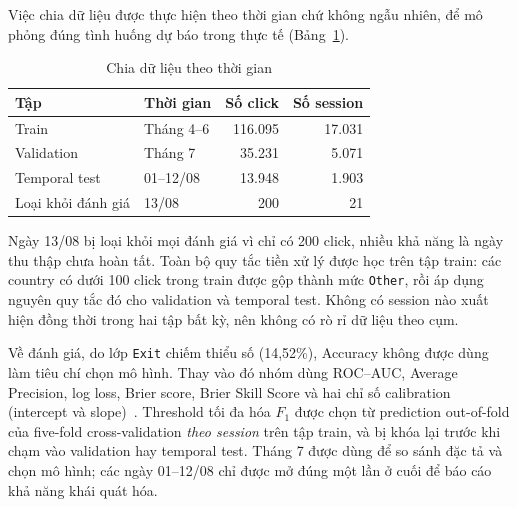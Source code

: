 Việc chia dữ liệu được thực hiện theo thời gian chứ không ngẫu nhiên, để mô phỏng
đúng tình huống dự báo trong thực tế (Bảng~\ref{tab:split}).

\begin{table}[H]
\centering
\caption{Chia dữ liệu theo thời gian}
\label{tab:split}
\begin{tabular}{llrr}
\toprule
\textbf{Tập} & \textbf{Thời gian} & \textbf{Số click} & \textbf{Số session} \\
\midrule
Train              & Tháng 4--6 & 116.095 & 17.031 \\
Validation         & Tháng 7    & 35.231  & 5.071 \\
Temporal test      & 01--12/08  & 13.948  & 1.903 \\
Loại khỏi đánh giá & 13/08      & 200     & 21 \\
\bottomrule
\end{tabular}
\end{table}

Ngày 13/08 bị loại khỏi mọi đánh giá vì chỉ có 200 click, nhiều khả năng là ngày
thu thập chưa hoàn tất. Toàn bộ quy tắc tiền xử lý được học trên tập train: các
country có dưới 100 click trong train được gộp thành mức \texttt{Other}, rồi áp
dụng nguyên quy tắc đó cho validation và temporal test. Không có session nào xuất
hiện đồng thời trong hai tập bất kỳ, nên không có rò rỉ dữ liệu theo cụm.

Về đánh giá, do lớp \texttt{Exit} chiếm thiểu số (14,52\%), Accuracy không được
dùng làm tiêu chí chọn mô hình. Thay vào đó nhóm dùng ROC--AUC, Average
Precision, log loss, Brier score, Brier Skill Score và hai chỉ số calibration
(intercept và slope)~\cite{steyerberg2010}. Threshold tối đa hóa $F_1$ được chọn
từ prediction out-of-fold của five-fold cross-validation \emph{theo session} trên
tập train, và bị khóa lại trước khi chạm vào validation hay temporal test.
Tháng 7 được dùng để so sánh đặc tả và chọn mô hình; các ngày 01--12/08 chỉ được
mở đúng một lần ở cuối để báo cáo khả năng khái quát hóa.
